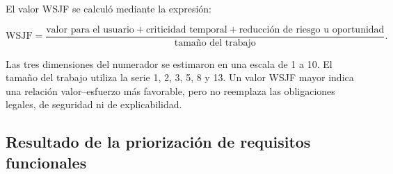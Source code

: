 \documentclass[12pt,a4paper]{article}
\begin{document}
El valor WSJF se calculó mediante la expresión:

\begin{equation}
\mathrm{WSJF}=\frac{\text{valor para el usuario}+\text{criticidad temporal}+\text{reducción de riesgo u oportunidad}}{\text{tamaño del trabajo}}.
\label{eq:wsjf}
\end{equation}

Las tres dimensiones del numerador se estimaron en una escala de 1 a 10. El tamaño del trabajo utiliza la serie 1, 2, 3, 5, 8 y 13. Un valor WSJF mayor indica una relación valor--esfuerzo más favorable, pero no reemplaza las obligaciones legales, de seguridad ni de explicabilidad.

\begin{landscape}
\subsection{Resultado de la priorización de requisitos funcionales}


\end{landscape}
\end{document}
